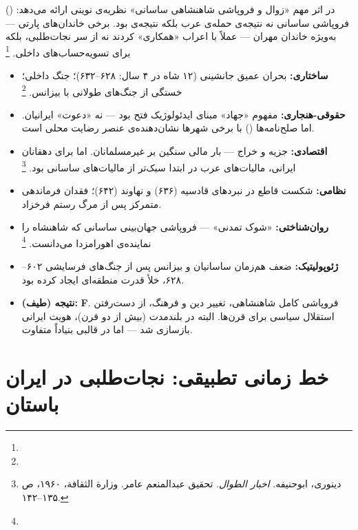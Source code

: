  () در اثر مهم «زوال و فروپاشی شاهنشاهی ساسانی» نظریه‌ی نوینی ارائه می‌دهد: فروپاشی ساسانی نه نتیجه‌ی حمله‌ی عرب بلکه نتیجه‌ی  بود. برخی خاندان‌های پارتی — به‌ویژه خاندان مهران — عملاً با اعراب «همکاری» کردند نه از سر نجات‌طلبی، بلکه برای تسویه‌حساب‌های داخلی.%
\footnote{}

\begin{tcolorbox}[casebox, title={تحلیل شش‌وجهی: فتح عرب ایران (۶۳۶–۶۵۱)}]
\begin{itemize}[nosep, rightmargin=1em]
  \item \textbf{ساختاری:} بحران عمیق جانشینی (۱۲ شاه در ۴ سال: ۶۲۸–۶۳۲)؛ جنگ داخلی؛ خستگی از جنگ‌های طولانی با بیزانس.%
  \footnote{}
  \item \textbf{حقوقی-هنجاری:} مفهوم «جهاد» مبنای ایدئولوژیک فتح بود — نه «دعوت» ایرانیان. اما صلح‌نامه‌ها () با برخی شهرها نشان‌دهنده‌ی عنصر رضایت محلی است.
  \item \textbf{اقتصادی:} جزیه و خراج — بار مالی سنگین بر غیرمسلمانان. اما برای دهقانان ایرانی، مالیات‌های عرب در ابتدا سبک‌تر از مالیات‌های ساسانی بود.%
  \footnote{دینوری، ابوحنیفه. \textit{اخبار الطوال}. تحقیق عبدالمنعم عامر. وزارة الثقافة، ۱۹۶۰، ص ۱۳۵--۱۴۲.}
  \item \textbf{نظامی:} شکست قاطع در نبردهای قادسیه (۶۳۶) و نهاوند (۶۴۲)؛ فقدان فرماندهی متمرکز پس از مرگ رستم فرخزاد.
  \item \textbf{روان‌شناختی:} «شوک تمدنی» — فروپاشی جهان‌بینی ساسانی که شاهنشاه را نماینده‌ی اهورامزدا می‌دانست.%
  \footnote{}
  \item \textbf{ژئوپولیتیک:} ضعف هم‌زمان ساسانیان و بیزانس پس از جنگ‌های فرسایشی ۶۰۲–۶۲۸، خلأ قدرت منطقه‌ای ایجاد کرده بود.
  \item \textbf{نتیجه (طیف):} \textbf{F}. فروپاشی کامل شاهنشاهی، تغییر دین و فرهنگ، از دست‌رفتن استقلال سیاسی برای قرن‌ها. البته در بلندمدت (بیش از دو قرن)، هویت ایرانی بازسازی شد — اما در قالبی بنیاداً متفاوت.
\end{itemize}
\end{tcolorbox}

\section{خط زمانی تطبیقی: نجات‌طلبی در ایران باستان}
\label{sec:ch04-timeline}

